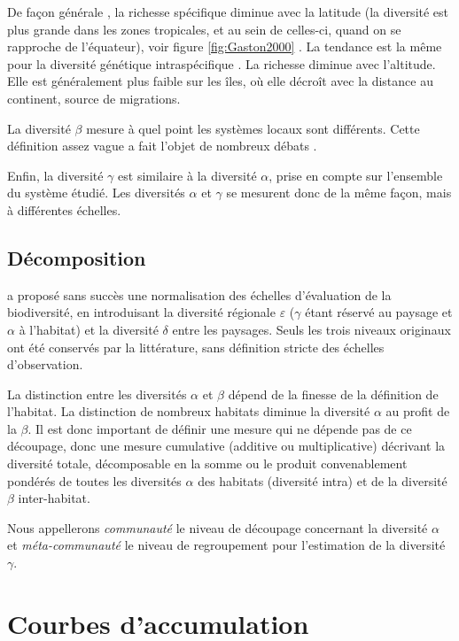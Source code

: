 \documentclass[
  11pt,
  american,
  a4paper,
  extrafontsizes,onecolumn,openright
  ]{memoir}
\begin{document}
De façon générale \autocite{Gaston2000}, la richesse spécifique diminue avec la latitude (la diversité est plus grande dans les zones tropicales, et au sein de celles-ci, quand on se rapproche de l'équateur), voir figure \ref{fig:Gaston2000} \autocite[figure 1]{Gaston2000}.
La tendance est la même pour la diversité génétique intraspécifique \autocite{Miraldo2016}.
La richesse diminue avec l'altitude.
Elle est généralement plus faible sur les îles, où elle décroît avec la distance au continent, source de migrations.

La diversité \(\beta\) mesure à quel point les systèmes locaux sont différents.
Cette définition assez vague a fait l'objet de nombreux débats \autocite{Moreno2010}.

Enfin, la diversité \(\gamma\) est similaire à la diversité \(\alpha\), prise en compte sur l'ensemble du système étudié.
Les diversités \(\alpha\) et \(\gamma\) se mesurent donc de la même façon, mais à différentes échelles.

\hypertarget{duxe9composition}{%
\subsection{Décomposition}\label{duxe9composition}}

\textcite{Whittaker1977} a proposé sans succès une normalisation des échelles d'évaluation de la biodiversité, en introduisant la diversité régionale \(\varepsilon\) (\(\gamma\) étant réservé au paysage et \(\alpha\) à l'habitat) et la diversité \(\delta\) entre les paysages.
Seuls les trois niveaux originaux ont été conservés par la littérature, sans définition stricte des échelles d'observation.

La distinction entre les diversités \(\alpha\) et \(\beta\) dépend de la finesse de la définition de l'habitat.
La distinction de nombreux habitats diminue la diversité \(\alpha\) au profit de la \(\beta\).
Il est donc important de définir une mesure qui ne dépende pas de ce découpage, donc une mesure cumulative (additive ou multiplicative) décrivant la diversité totale, décomposable en la somme ou le produit convenablement pondérés de toutes les diversités \(\alpha\) des habitats (diversité intra) et de la diversité \(\beta\) inter-habitat.

Nous appellerons \emph{communauté} le niveau de découpage concernant la diversité \(\alpha\) et \emph{méta-communauté} le niveau de regroupement pour l'estimation de la diversité \(\gamma\).

\hypertarget{courbes-daccumulation}{%
\section{Courbes d'accumulation}\label{courbes-daccumulation}}
\end{document}

